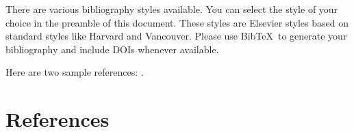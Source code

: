 \documentclass[review]{elsarticle}
\begin{document}
There are various bibliography styles available. You can select the style of your choice in the preamble of this document. These styles are Elsevier styles based on standard styles like Harvard and Vancouver. Please use Bib\TeX\ to generate your bibliography and include DOIs whenever available.

Here are two sample references: \cite{Feynman1963118,Dirac1953888}.

\section*{References}


\end{document}
